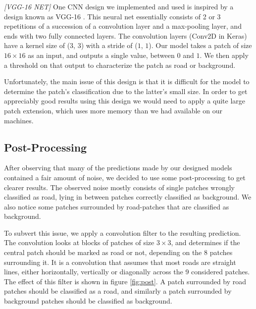 \documentclass[10pt,conference,compsocconf]{IEEEtran}
\begin{document}
\textit{[VGG-16 NET]}
One CNN design we implemented and used is inspired by a design known as VGG-16 \cite{vgg}. This neural net essentially consists of 2 or 3 repetitions of a succession of a convolution layer and a max-pooling layer, and ends with two fully connected layers. The convolution layers (Conv2D in Keras) have a kernel size of ($3$, $3$) with a stride of ($1$, $1$). Our model takes a patch of size $16 \times 16$ as an input, and outputs a single value, between $0$ and $1$. We then apply a threshold on that output to characterize the patch as road or background.

Unfortunately, the main issue of this design is that it is difficult for the model to determine the patch's classification due to the latter's small size. In order to get appreciably good results using this design we would need to apply a quite large patch extension, which uses more memory than we had available on our machines.


\subsection{Post-Processing} 
\label{ssec:post}

After observing that many of the predictions made by our designed models contained a fair amount of noise, we decided to use some post-processing to get clearer results. The observed noise mostly consists of single patches wrongly classified as road, lying in between patches correctly classified as background. We also notice some patches surrounded by road-patches that are classified as background.

To subvert this issue, we apply a convolution filter to the resulting prediction. The convolution looks at blocks of patches of size $3 \times 3$, and determines if the central patch should be marked as road or not, depending on the $8$ patches surrounding it. It is a convolution that assumes that most roads are straight lines, either horizontally, vertically or diagonally across the 9 considered patches. The effect of this filter is shown in figure \ref{fig:post}. A patch surrounded by road patches should be classified as a road, and similarly a patch surrounded by background patches should be classified as background.
\end{document}
